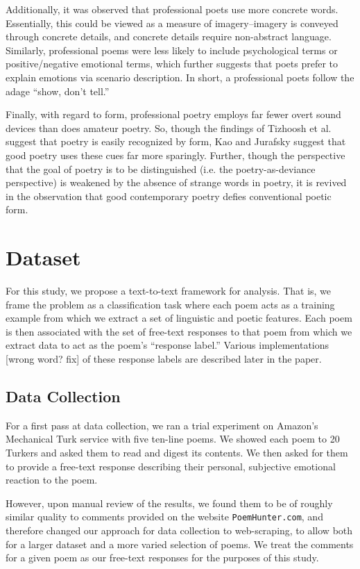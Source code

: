 \documentclass[11pt]{article}
\begin{document}
Additionally, it was observed that professional poets use more concrete words. Essentially, this could be viewed as a measure of imagery--imagery is conveyed through concrete details, and concrete details require non-abstract language. Similarly, professional poems were less likely to include psychological terms or positive/negative emotional terms, which further suggests that poets prefer to explain emotions via scenario description. In short, a professional poets follow the adage ``show, don’t tell.''

Finally, with regard to form, professional poetry employs far fewer overt sound devices than does amateur poetry. So, though the findings of Tizhoosh et al. suggest that poetry is easily recognized by form, Kao and Jurafsky suggest that good poetry uses these cues far more sparingly. Further, though the perspective that the goal of poetry is to be distinguished (i.e. the poetry-as-deviance perspective) is weakened by the absence of strange words in poetry, it is revived in the observation that good contemporary poetry defies conventional poetic form.

\section{Dataset}
For this study, we propose a text-to-text framework for analysis. That is, we frame the problem as a classification task where each poem acts as a training example from which we extract a set of linguistic and poetic features. Each poem is then associated with the set of free-text responses to that poem from which we extract data to act as the poem's ``response label.'' Various implementations [wrong word? fix] of these response labels are described later in the paper.

\subsection*{Data Collection}
For a first pass at data collection, we ran a trial experiment on Amazon's Mechanical Turk service with five ten-line poems. We showed each poem to 20 Turkers and asked them to read and digest its contents. We then asked for them to provide a free-text response describing their personal, subjective emotional reaction to the poem. 

However, upon manual review of the results, we found them to be of roughly similar quality to comments provided on the website \texttt{PoemHunter.com}, and therefore changed our approach for data collection to web-scraping, to allow both for a larger dataset and a more varied selection of poems. We treat the comments for a given poem as our free-text responses for the purposes of this study.
\end{document}

